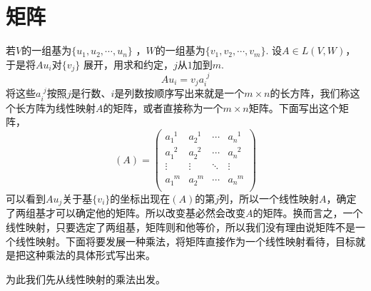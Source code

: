 \documentclass[11pt,a4paper,openany]{book}%
\theoremstyle{plain}%
\begin{document}
\section{矩阵}
若$V$的一组基为$\{u_{1},u_{2},\cdots,u_{n}\}$ ，$W$的一组基为$\{v_{1},v_{2},\cdots,v_{m}\}$.
设$A\in L(V,W)$，于是将$Au_{i}$对$\{v_{j}\}$ 展开，用求和约定，$j$从$1$加到$m$.
$$Au_{i}=v_{j}a_{i}^{\phantom{i}j}$$
将这些$a_{i}^{\phantom{i}j}$按照$j$是行数、$i$是列数按顺序写出来就是一个$m\times n$的长方阵，我们称这个长方阵为线性映射$A$的矩阵，或者直接称为一个$m\times n$矩阵。下面写出这个矩阵，
\[
(A)=
\begin{pmatrix}
	a_{1}^{\phantom{1}1} & a_{2}^{\phantom{2}1} & \cdots & a_{n}^{\phantom{n}1}\\
	a_{1}^{\phantom{1}2} & a_{2}^{\phantom{2}2} & \cdots & a_{n}^{\phantom{n}2}\\
	\vdots & \vdots & \ddots & \vdots \\
	a_{1}^{\phantom{1}m} & a_{2}^{\phantom{2}m} & \cdots & a_{n}^{\phantom{n}m}\\
\end{pmatrix}
\]
\indent 可以看到$Au_{j}$关于基$\{v_i\}$的坐标出现在$(A)$的第$j$列，所以一个线性映射$A$，确定了两组基才可以确定他的矩阵。所以改变基必然会改变$A$的矩阵。换而言之，一个线性映射，只要选定了两组基，矩阵则和他等价，所以我们没有理由说矩阵不是一个线性映射。下面将要发展一种乘法，将矩阵直接作为一个线性映射看待，目标就是把这种乘法的具体形式写出来。

为此我们先从线性映射的乘法出发。
\end{document}
